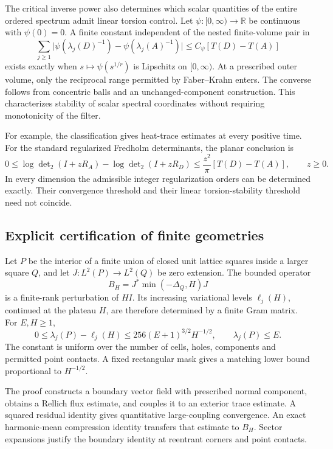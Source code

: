 \documentclass[11pt,reqno]{amsart}
\numberwithin{equation}{section}
\newcommand{\R}{\mathbb R}
\newcommand{\abs}[1]{\lvert#1\rvert}
\begin{document}
The critical inverse power also determines which scalar quantities
of the entire ordered spectrum admit linear torsion control. Let
\(\psi:[0,\infty)\to\R\) be continuous with \(\psi(0)=0\). A finite
constant independent of the nested finite-volume pair in
\begin{equation}\label{intro:filters}
 \sum_{j\ge1}
 \abs{\psi(\lambda_j(D)^{-1})-\psi(\lambda_j(A)^{-1})}
 \le C_\psi[T(D)-T(A)]
\end{equation}
exists exactly when \(s\mapsto\psi(s^{1/r})\) is Lipschitz on
\([0,\infty)\). At a prescribed outer volume, only the reciprocal
range permitted by Faber--Krahn enters. The converse follows from
concentric balls and an unchanged-component construction.
This characterizes stability of scalar spectral coordinates without
requiring monotonicity of the filter.

For example, the classification gives heat-trace estimates at every
positive time. For the standard regularized Fredholm determinants,
the planar conclusion is
\[
 0\le \log\det\nolimits_2(I+zR_A)-\log\det\nolimits_2(I+zR_D)
 \le \frac{z^2}{\pi}[T(D)-T(A)],\qquad z\ge0.
\]
In every dimension the admissible integer regularization orders can
be determined exactly. Their convergence threshold and their
linear torsion-stability threshold need not coincide.

\subsection*{Explicit certification of finite geometries}

Let \(P\) be the interior of a finite union of closed unit lattice
squares inside a larger square \(Q\), and let \(J:L^2(P)\to L^2(Q)\)
be zero extension. The bounded operator
\[
 B_H=J^*\min(-\Delta_Q,H)J
\]
is a finite-rank perturbation of \(HI\). Its increasing variational
levels \(\ell_j(H)\), continued at the plateau \(H\), are therefore
determined by a finite Gram matrix. For \(E,H\ge1\),
\begin{equation}\label{intro:clipping}
 0\le \lambda_j(P)-\ell_j(H)
 \le256(E+1)^{3/2}H^{-1/2},
 \qquad \lambda_j(P)\le E.
\end{equation}
The constant is uniform over the number of cells, holes, components
and permitted point contacts. A fixed rectangular mask gives a
matching lower bound proportional to \(H^{-1/2}\).

The proof constructs a boundary vector field with prescribed normal
component, obtains a Rellich flux estimate, and couples it to an
exterior trace estimate. A squared residual identity gives
quantitative large-coupling convergence. An exact harmonic-mean
compression identity transfers that estimate to \(B_H\).
Sector expansions justify the boundary identity at reentrant
corners and point contacts.
\end{document}
